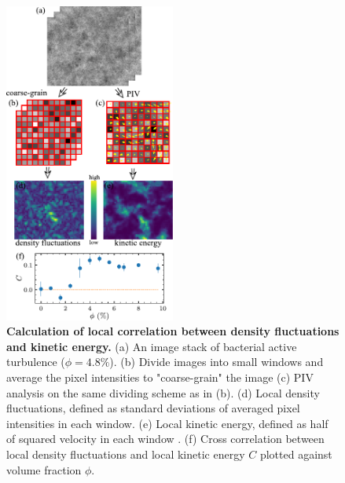 \documentclass[twocolumn,aps,prl,amsmath,amssymb,longbibliography]{revtex4-2}
\begin{document}
\begin{figure}[!]
\begin{center}
\includegraphics[width=0.5\textwidth]{figures/fig-5/v3.pdf}
\caption[Concentration dependence of GNF.]
{
\textbf{Calculation of local correlation between density fluctuations and kinetic energy.}
(a) An image stack of bacterial active turbulence ($\phi=4.8\%$).
(b) Divide images into small windows and average the pixel intensities to "coarse-grain" the image
(c) PIV analysis on the same dividing scheme as in (b).
(d) Local density fluctuations, defined as standard deviations of averaged pixel intensities in each window.
(e) Local kinetic energy, defined as half of squared velocity in each window .
(f) Cross correlation between local density fluctuations and local kinetic energy $C$ plotted against volume fraction $\phi$.
}
\label{local-correlation}
\end{center}
\end{figure}
\end{document}
